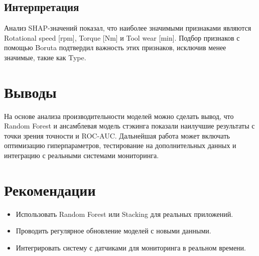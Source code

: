 \documentclass[a4paper,12pt]{article}
\begin{document}
\subsection{Интерпретация}
Анализ SHAP-значений показал, что наиболее значимыми признаками являются Rotational speed [rpm], Torque [Nm] и Tool wear [min]. Подбор признаков с помощью Boruta подтвердил важность этих признаков, исключив менее значимые, такие как Type.

\section{Выводы}
На основе анализа производительности моделей можно сделать вывод, что Random Forest и ансамблевая модель стэкинга показали наилучшие результаты с точки зрения точности и ROC-AUC. Дальнейшая работа может включать оптимизацию гиперпараметров, тестирование на дополнительных данных и интеграцию с реальными системами мониторинга.

\section{Рекомендации}
\begin{itemize}
    \item Использовать Random Forest или Stacking для реальных приложений.
    \item Проводить регулярное обновление моделей с новыми данными.
    \item Интегрировать систему с датчиками для мониторинга в реальном времени.
\end{itemize}



\end{document}
